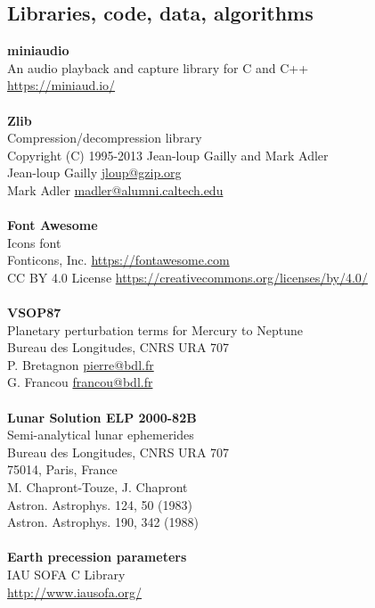 \documentclass[Orbiter User Manual.tex]{subfiles}
\begin{document}
\subsection{Libraries, code, data, algorithms}
\textbf{miniaudio}\\
An audio playback and capture library for C and C++\\
\url{https://miniaud.io/}\\
\\
\textbf{Zlib}\\
Compression/decompression library\\
Copyright (C) 1995-2013 Jean-loup Gailly and Mark Adler\\
Jean-loup Gailly \href{mailto:jloup@gzip.org}{jloup@gzip.org}\\
Mark Adler \href{mailto:madler@alumni.caltech.edu}{madler@alumni.caltech.edu}\\
\\
\textbf{Font Awesome}\\
Icons font\\
Fonticons, Inc. \url{https://fontawesome.com}\\
CC BY 4.0 License \url{https://creativecommons.org/licenses/by/4.0/}\\
\\
\textbf{VSOP87}\\
Planetary perturbation terms for Mercury to Neptune\\
Bureau des Longitudes, CNRS URA 707\\
P. Bretagnon \href{mailto:pierre@bdl.fr}{pierre@bdl.fr}\\
G. Francou \href{mailto:francou@bdl.fr}{francou@bdl.fr}\\
\\
\textbf{Lunar Solution ELP 2000-82B}\\
Semi-analytical lunar ephemerides\\
Bureau des Longitudes, CNRS URA 707\\
75014, Paris, France\\
M. Chapront-Touze, J. Chapront\\
Astron. Astrophys. 124, 50 (1983)\\
Astron. Astrophys. 190, 342 (1988)\\
\\
\textbf{Earth precession parameters}\\
IAU SOFA C Library\\
\url{http://www.iausofa.org/}\\
\\
\end{document}
